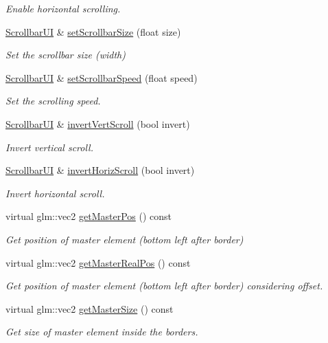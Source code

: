 \begin{DoxyCompactItemize}
\begin{DoxyCompactList}\small\item\em Enable horizontal scrolling. \end{DoxyCompactList}\item 
\hyperlink{class_scrollbar_u_i}{Scrollbar\+UI} \& \hyperlink{class_scrollbar_u_i_ae42a6691cc86a27ffdf5491976cf5eb1}{set\+Scrollbar\+Size} (float size)
\begin{DoxyCompactList}\small\item\em Set the scrollbar size (width) \end{DoxyCompactList}\item 
\hyperlink{class_scrollbar_u_i}{Scrollbar\+UI} \& \hyperlink{class_scrollbar_u_i_a4106fe5566d4041d348e14025fc12b4a}{set\+Scrollbar\+Speed} (float speed)
\begin{DoxyCompactList}\small\item\em Set the scrolling speed. \end{DoxyCompactList}\item 
\hyperlink{class_scrollbar_u_i}{Scrollbar\+UI} \& \hyperlink{class_scrollbar_u_i_a3938a8a583e40efef2996bd76ec0b73e}{invert\+Vert\+Scroll} (bool invert)
\begin{DoxyCompactList}\small\item\em Invert vertical scroll. \end{DoxyCompactList}\item 
\hyperlink{class_scrollbar_u_i}{Scrollbar\+UI} \& \hyperlink{class_scrollbar_u_i_a7af0e6e6a2cde698fe84d516761c47aa}{invert\+Horiz\+Scroll} (bool invert)
\begin{DoxyCompactList}\small\item\em Invert horizontal scroll. \end{DoxyCompactList}\item 
virtual glm\+::vec2 \hyperlink{class_scrollbar_u_i_a3a4c39a263f6bf7783b1054f57a26ee7}{get\+Master\+Pos} () const
\begin{DoxyCompactList}\small\item\em Get position of master element (bottom left after border) \end{DoxyCompactList}\item 
virtual glm\+::vec2 \hyperlink{class_scrollbar_u_i_a7dd8afe939f8b8a5f9486eeec1f56d92}{get\+Master\+Real\+Pos} () const
\begin{DoxyCompactList}\small\item\em Get position of master element (bottom left after border) considering offset. \end{DoxyCompactList}\item 
virtual glm\+::vec2 \hyperlink{class_scrollbar_u_i_ad9f2de5f7fbb4acdfe25fc2dbe3eb943}{get\+Master\+Size} () const
\begin{DoxyCompactList}\small\item\em Get size of master element inside the borders. \end{DoxyCompactList}\end{DoxyCompactItemize}
